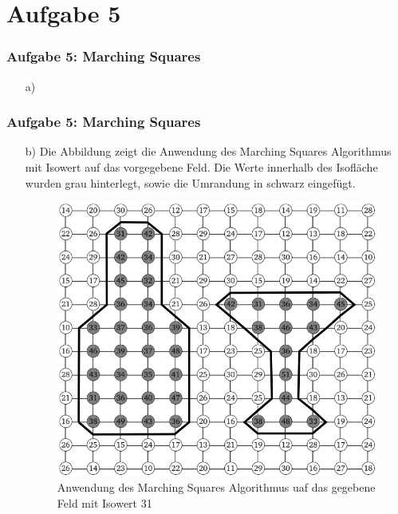 \documentclass[accentcolor=tud9c,colorbacktitle,inverttitle,landscape,german,presentation,t]{tudbeamer}
\begin{document}
\section{Aufgabe 5}
\begin{frame}
	\frametitle{Aufgabe 5: Marching Squares}
	\begin{itemize}
		\item[a)] %
		
	\end{itemize}
\end{frame}
\begin{frame}
	\frametitle{Aufgabe 5: Marching Squares}
	\begin{itemize}
		\item[b)] %
		Die Abbildung zeigt die Anwendung des Marching Squares Algorithmus mit Isowert auf das vorgegebene Feld. Die Werte innerhalb des Isofläche wurden grau hinterlegt, sowie die Umrandung in schwarz eingefügt.
		\begin{figure}
			\includegraphics[width = .4\linewidth]{task_5b.png}
			\caption{Anwendung des Marching Squares Algorithmus uaf das gegebene Feld mit Isowert 31}
			\label{MaSq}
		\end{figure}
	\end{itemize}
\end{frame}
\end{document}
